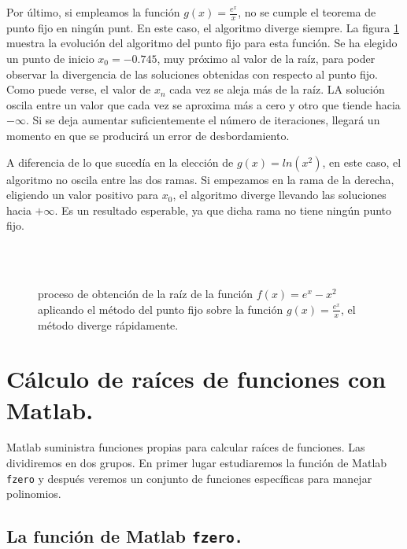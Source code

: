 Por último, si empleamos la función $g(x)=\frac{e^x}{x}$, no se cumple el teorema de punto fijo en ningún punt. En este caso, el algoritmo diverge siempre.  La figura \ref{fig:pfijo5} muestra la evolución del algoritmo del punto fijo para esta función. Se ha elegido un punto de inicio $x_0=-0.745$, muy próximo al valor de la raíz, para poder observar la divergencia de las soluciones obtenidas con respecto al punto fijo. Como puede verse, el valor de $x_n$ cada vez se aleja más de la raíz. LA solución oscila entre un valor que cada vez se aproxima más a cero y otro que tiende hacia $-\infty$. Si se deja aumentar suficientemente el número de iteraciones, llegará un momento en que se producirá un error de desbordamiento. 

A diferencia de lo que sucedía en la elección de $g(x)=ln(x^2)$, en este caso, el algoritmo no oscila entre las dos ramas. Si empezamos en la rama de la derecha, eligiendo un valor positivo para $x_0$, el algoritmo diverge llevando las soluciones hacia $+\infty$. Es un resultado esperable, ya que dicha rama no tiene ningún punto fijo.

\begin{figure}
\centering
{} \qquad
{}\\
\qquad
{}\\
\qquad
{}

\caption{proceso de obtención de la raíz de la función $f(x)=e^x-x^2$ aplicando el método del punto fijo sobre la función $g(x)=\frac{e^x}{x}$, el método diverge rápidamente.}
\label{fig:pfijo5}
\end{figure}

\section{Cálculo de raíces de funciones con Matlab.}

Matlab suministra funciones propias para calcular raíces de funciones.  Las dividiremos en dos grupos. En primer lugar estudiaremos la función de Matlab \texttt{fzero} y después veremos un conjunto de funciones específicas para manejar polinomios.

\subsection{La función de Matlab \texttt{fzero.}}

